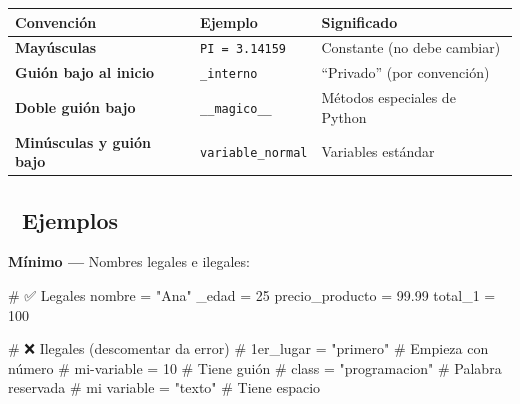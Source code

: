 \documentclass[
  doc,
  floatsintext,
  longtable,
  a4paper,
  nolmodern,
  notxfonts,
  notimes,
  12pt,
  colorlinks=true,linkcolor=blue,citecolor=blue,urlcolor=blue]{apa7}
\newenvironment{Shaded}{\begin{snugshade}}{\end{snugshade}}
\newcommand{\CommentTok}[1]{\textcolor[rgb]{0.37,0.37,0.37}{#1}}
\newcommand{\DecValTok}[1]{\textcolor[rgb]{0.68,0.00,0.00}{#1}}
\newcommand{\FloatTok}[1]{\textcolor[rgb]{0.68,0.00,0.00}{#1}}
\newcommand{\NormalTok}[1]{\textcolor[rgb]{0.00,0.23,0.31}{#1}}
\newcommand{\OperatorTok}[1]{\textcolor[rgb]{0.37,0.37,0.37}{#1}}
\newcommand{\StringTok}[1]{\textcolor[rgb]{0.13,0.47,0.30}{#1}}
\newcounter{none} %
\begin{document}
{\def\LTcaptype{none} %
\begin{longtable}[]{@{}
  >{\raggedright\arraybackslash}p{}
  >{\raggedright\arraybackslash}p{}
  >{\raggedright\arraybackslash}p{}@{}}
\toprule\noalign{}
\begin{minipage}[b]{\linewidth}\raggedright
Convención
\end{minipage} & \begin{minipage}[b]{\linewidth}\raggedright
Ejemplo
\end{minipage} & \begin{minipage}[b]{\linewidth}\raggedright
Significado
\end{minipage} \\
\midrule\noalign{}
\endhead
\bottomrule\noalign{}
\endlastfoot
\textbf{Mayúsculas} & \texttt{PI\ =\ 3.14159} & Constante (no debe
cambiar) \\
\textbf{Guión bajo al inicio} & \texttt{\_interno} & ``Privado'' (por
convención) \\
\textbf{Doble guión bajo} & \texttt{\_\_magico\_\_} & Métodos especiales
de Python \\
\textbf{Minúsculas y guión bajo} & \texttt{variable\_normal} & Variables
estándar \\
\end{longtable}
}

\subsection{🔬 Ejemplos}\label{ejemplos}

\textbf{Mínimo ---} Nombres legales e ilegales:

\begin{Shaded}
\begin{Highlighting}[]
\CommentTok{\# ✅ Legales}
\NormalTok{nombre }\OperatorTok{=} \StringTok{"Ana"}
\NormalTok{\_edad }\OperatorTok{=} \DecValTok{25}
\NormalTok{precio\_producto }\OperatorTok{=} \FloatTok{99.99}
\NormalTok{total\_1 }\OperatorTok{=} \DecValTok{100}

\CommentTok{\# ❌ Ilegales (descomentar da error)}
\CommentTok{\# 1er\_lugar = "primero"     \# Empieza con número}
\CommentTok{\# mi{-}variable = 10          \# Tiene guión}
\CommentTok{\# class = "programacion"    \# Palabra reservada}
\CommentTok{\# mi variable = "texto"     \# Tiene espacio}
\end{Highlighting}
\end{Shaded}
\end{document}
